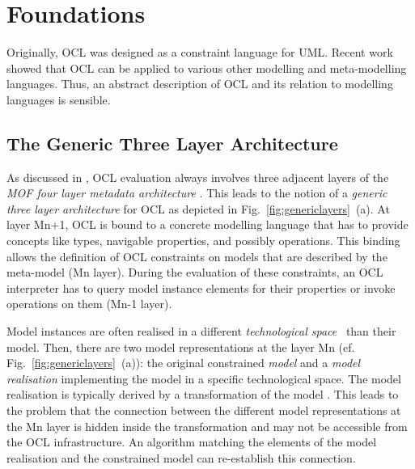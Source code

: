 \section{Foundations}
\label{sec:foundation}

Originally, OCL was designed as a constraint language for UML. Recent work showed
that OCL can be applied to various other modelling and meta-modelling languages. Thus,
an abstract description of OCL and its relation to modelling languages is sensible.

\subsection{The Generic Three Layer Architecture}
As discussed in \cite{demuthRGWS09}, OCL evaluation
always involves three adjacent layers of the \emph{MOF four layer metadata
architecture} \cite{spec:MOF1-4}. This leads to the notion of 
a \emph{generic three layer architecture} for OCL as depicted in
Fig.~\ref{fig:genericlayers}~(a). 
At layer Mn+1, OCL is bound to a concrete modelling language that has to provide 
concepts like
types, navigable properties, and possibly operations. 
This binding allows the definition of
OCL constraints on models that are described by the meta-model (Mn layer).
During the evaluation of these constraints, an OCL interpreter has to query model
instance elements for their properties or invoke operations on them ({Mn-1} layer).

Model instances are often realised in
a different \emph{technological space}~\cite{kurtev2002technological} than their model. Then, there are two model
representations at the layer Mn (cf. Fig.~\ref{fig:genericlayers}~(a)): the original constrained \emph{model} and a
\emph{model realisation} implementing the model in a specific technological space. The
model realisation is typically derived by a transformation of the model
\cite{WWW:EMF}. 
This leads to the problem that the connection between the different model representations
at the Mn layer is hidden inside the transformation and may not be accessible from the OCL infrastructure.
An algorithm matching the elements of the model realisation and the constrained model can re-establish
this connection.

